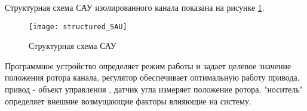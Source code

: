 Структурная схема САУ изолированного канала показана на рисунке \ref{fig:structured_SAU}.

\begin{figure}[ht]
	\centering
	\texttt{[image: structured\_SAU]}
	\caption{Структурная схема САУ}
	\label{fig:structured_SAU}
\end{figure}

Программное устройство определяет режим работы и задает целевое значение положения ротора канала, регулятор обеспечивает оптимальную работу привода, привод - объект управления , 
датчик угла измеряет положение ротора, "носитель" определяет внешние возмущающие факторы влияющие на систему.


